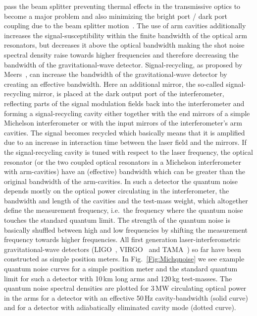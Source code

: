 pass the beam splitter preventing thermal effects in the
transmissive optics to become a major problem and also minimizing
the bright port / dark port coupling due to the beam splitter
motion~\cite{Harms2004}. The use of arm cavities additionally
increases the signal-susceptibility within the finite bandwidth of
the optical arm resonators, but decreases it above the optical
bandwidth making the shot noise spectral density raise towards
higher frequencies and therefore decreasing the bandwidth of the
gravitational-wave detector. Signal-recycling, as proposed by
Meers~\cite{Meers1988}, can increase the bandwidth of the
gravitational-wave detector by creating an effective bandwidth.
Here an additional mirror, the so-called signal-recycling mirror,
is placed at the dark output port of the interferometer,
reflecting parts of the signal modulation fields back into the
interferometer and forming a signal-recycling cavity either
together with the end mirrors of a simple Michelson interferometer
or with the input mirrors of the interferometer's arm cavities.
The signal becomes recycled which basically means that it is
amplified due to an increase in interaction time between the laser
field and the mirrors. If the signal-recycling cavity is tuned
with respect to the laser frequency, the optical resonator (or the
two coupled optical resonators in a Michelson interferometer with
arm-cavities) have an (effective) bandwidth
which can be greater than the original bandwidth of the
arm-cavities. In such a detector the quantum noise depends mostly
on the optical power circulating in the interferometer, the
bandwidth and length of the cavities and the test-mass weight,
which altogether define the measurement frequency, i.e.\ the
frequency where the quantum noise touches the standard quantum
limit. The strength of the quantum noise is basically shuffled
between high and low frequencies by shifting the measurement
frequency towards higher frequencies. All first generation
laser-interferometric gravitational-wave detectors
(LIGO~\cite{Abbott2009}, VIRGO~\cite{Fiore2002} and
TAMA~\cite{Ando2001}) so far have been constructed as simple
position meters. In Fig.~\ref{Fig:Michqnoise} we see example
quantum noise curves for a simple position meter and the standard
quantum limit for such a detector with 10\,km long arms and
120\,kg test-masses. The quantum noise spectral densities are
plotted for 3\,MW circulating optical power in the arms for a
detector with an effective 50\,Hz cavity-bandwidth (solid curve)
and for a detector with adiabatically eliminated cavity mode
(dotted curve).

